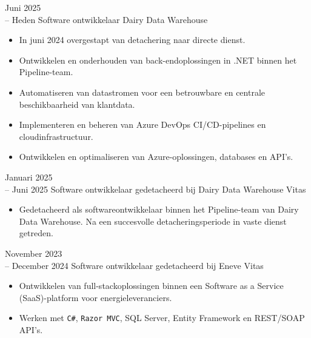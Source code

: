 \documentclass[9pt]{developercv} %
\begin{document}
\vspace{-10 pt}
\begin{entrylist}
    \entry
        {Juni 2025 \\ -- Heden}
		{Software ontwikkelaar}
		{Dairy Data Warehouse}
		{\vspace{-10pt}
        \begin{itemize}[noitemsep,topsep=0pt,parsep=0pt,partopsep=0pt, leftmargin=-1pt]
            \item In juni 2024 overgestapt van detachering naar directe dienst.
            \item Ontwikkelen en onderhouden van back-endoplossingen in .NET binnen het Pipeline-team.
            \item Automatiseren van datastromen voor een betrouwbare en centrale beschikbaarheid van klantdata.
            \item Implementeren en beheren van Azure DevOps CI/CD-pipelines en cloudinfrastructuur.
            \item Ontwikkelen en optimaliseren van Azure-oplossingen, databases en API's.
        \end{itemize}}
    \entry
        {Januari 2025 \\ -- Juni 2025}
		{Software ontwikkelaar gedetacheerd bij Dairy Data Warehouse}
		{Vitas}
		{\vspace{-10pt}
        \begin{itemize}[noitemsep,topsep=0pt,parsep=0pt,partopsep=0pt, leftmargin=-1pt]
            \item Gedetacheerd als softwareontwikkelaar binnen het Pipeline-team van Dairy Data Warehouse. Na een succesvolle detacheringsperiode in vaste dienst getreden.
        \end{itemize}}
	\entry
        {November 2023 \\ -- December 2024}
		{Software ontwikkelaar gedetacheerd bij Eneve}
		{Vitas}
		{\vspace{-10pt}
        \begin{itemize}[noitemsep,topsep=0pt,parsep=0pt,partopsep=0pt, leftmargin=-1pt]
            \item Ontwikkelen van full-stackoplossingen binnen een Software as a Service (SaaS)-platform voor energieleveranciers.
            \item Werken met \texttt{C\#}, \texttt{Razor MVC}, SQL Server, Entity Framework en REST/SOAP API's.

\end{itemize}}
\end{entrylist}
\end{document}
